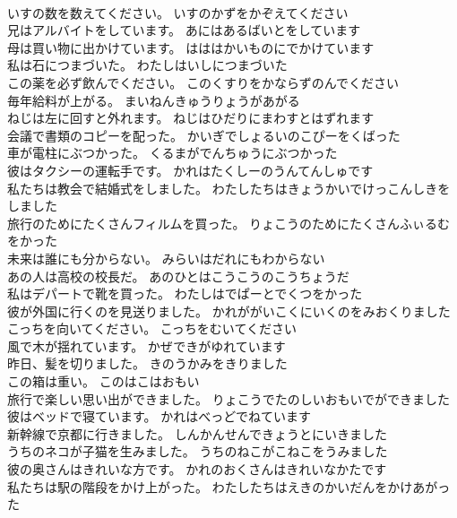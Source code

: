 \documentclass[8pt]{extreport}
\begin{document}
\begin{CJK}{UTF8}{min}
\\	いすの数を数えてください。	いすのかずをかぞえてください 
\\	兄はアルバイトをしています。	あにはあるばいとをしています 
\\	母は買い物に出かけています。	はははかいものにでかけています 
\\	私は石につまづいた。	わたしはいしにつまづいた 
\\	この薬を必ず飲んでください。	このくすりをかならずのんでください 
\\	毎年給料が上がる。	まいねんきゅうりょうがあがる 
\\	ねじは左に回すと外れます。	ねじはひだりにまわすとはずれます 
\\	会議で書類のコピーを配った。	かいぎでしょるいのこぴーをくばった 
\\	車が電柱にぶつかった。	くるまがでんちゅうにぶつかった 
\\	彼はタクシーの運転手です。	かれはたくしーのうんてんしゅです 
\\	私たちは教会で結婚式をしました。	わたしたちはきょうかいでけっこんしきをしました 
\\	旅行のためにたくさんフィルムを買った。	りょこうのためにたくさんふぃるむをかった 
\\	未来は誰にも分からない。	みらいはだれにもわからない 
\\	あの人は高校の校長だ。	あのひとはこうこうのこうちょうだ 
\\	私はデパートで靴を買った。	わたしはでぱーとでくつをかった 
\\	彼が外国に行くのを見送りました。	かれががいこくにいくのをみおくりました 
\\	こっちを向いてください。	こっちをむいてください 
\\	風で木が揺れています。	かぜできがゆれています 
\\	昨日、髪を切りました。	きのうかみをきりました 
\\	この箱は重い。	このはこはおもい 
\\	旅行で楽しい思い出ができました。	りょこうでたのしいおもいでができました 
\\	彼はベッドで寝ています。	かれはべっどでねています 
\\	新幹線で京都に行きました。	しんかんせんできょうとにいきました 
\\	うちのネコが子猫を生みました。	うちのねこがこねこをうみました 
\\	彼の奥さんはきれいな方です。	かれのおくさんはきれいなかたです 
\\	私たちは駅の階段をかけ上がった。	わたしたちはえきのかいだんをかけあがった 

\end{CJK}
\end{document}

